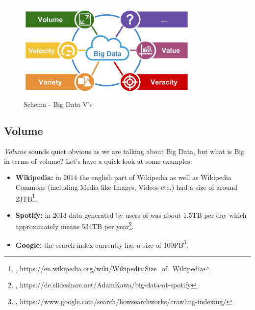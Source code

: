 \begin{figure}[ht]
	\centering
  \includegraphics[width=0.8\textwidth]{bigdata_vs.png}
	\caption{Schema - Big Data V's}
	\label{bigdata_vs}
\end{figure}

\subsection{Volume}
\label{bd_vs_volume}
\textit{Volume} sounds quiet obvious as we are talking about Big Data, but what is Big in terms of volume? Let's have a quick look at some examples: 
\begin{itemize}
	\item \textbf{Wikipedia:} in 2014 the english part of Wikipedia as well as Wikipedia Commons (including Media like Images, Videos etc.) had a size of around 23TB\footnote{\cite{WPS}, https://en.wikipedia.org/wiki/Wikipedia:Size\_of\_Wikipedia}.
	\item \textbf{Spotify:} in 2013 data generated by users of was about 1,5TB per day which approximately means 534TB per year\footnote{\cite{SPTFYV}, https://de.slideshare.net/AdamKawa/big-data-at-spotify}.
	\item \textbf{Google:} the search index currently has a size of 100PB\footnote{\cite{GSIS}, https://www.google.com/search/howsearchworks/crawling-indexing/}.\\
\end{itemize}

